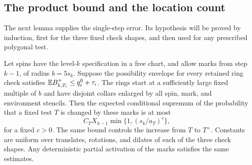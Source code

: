 \subsection{The product bound and the location count}

The next lemma supplies the single-step error.  Its hypothesis will be
proved by induction, first for the three fixed check shapes, and then
used for any prescribed polygonal test.

\begin{lemma}
\label{cross:single-level}
Let spins have the level-$k$ specification in a free chart, and allow
marks from step $k-1$, of radius $b=5s_k$.  Suppose the possibility envelope for every retained ring check satisfies
$\mathbb E B^+_{k,T_i}\leq q_i^0+\tau_i$.  The rings start at a sufficiently
large fixed multiple of $b$ and have disjoint collars enlarged by all
spin, mark, and environment stencils.  Then the expected conditional
supremum of the probability that a fixed test $T$ is changed by these
marks is at most
\begin{equation}
 C_TX_{k-1}\min\{1,(s_k/a_T)^c\},
 \label{cross:one-step-error}
\end{equation}
for a fixed $c>0$.  The same bound controls the increase from $T$ to
$T^+$.  Constants are uniform over translates, rotations, and dilates of
each of the three check shapes.  Any deterministic partial activation
of the marks satisfies the same estimates.
\end{lemma}

